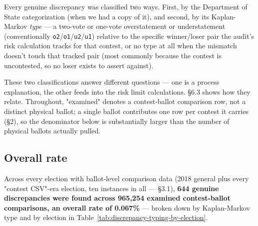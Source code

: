 Every genuine discrepancy was classified two ways. First, by
the Department of State categorization (when we had a copy of it),
and second, by its Kaplan-Markov \textit{type} — a two-vote or one-vote overstatement or
understatement (conventionally \texttt{o2}/\texttt{o1}/\texttt{u2}/\texttt{u1}) relative to the
specific winner/loser pair the audit's risk calculation tracks for that
contest, or no type at all when the mismatch doesn't touch that tracked
pair (most commonly because the contest is uncontested, so no loser exists
to assert against).

These two classifications answer different questions — one is
a process explanation, the other feeds into the risk limit calculations.
§6.3 shows how they relate. Throughout, "examined" denotes a
contest-ballot comparison row, not a distinct physical ballot; a single
ballot contributes one row per contest it carries (§2), so the
denominator below is substantially larger than the number of physical
ballots actually pulled.

\subsection{Overall rate}

Across every election with ballot-level comparison data (2018 general
plus every "contest CSV"-era election, ten instances in all — §3.1),
\textbf{644 genuine discrepancies were found across 965,254 examined
contest-ballot comparisons, an overall rate of 0.067\%} — broken down by
Kaplan-Markov type and by election in Table~\ref{tab:discrepancy-typing-by-election}.

